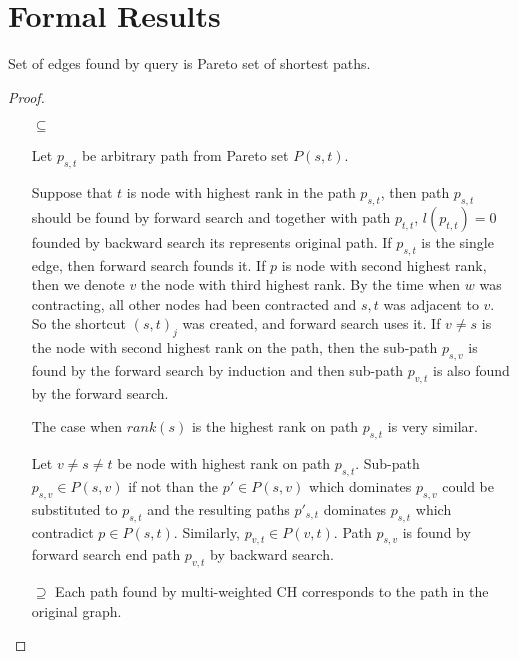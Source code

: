 

\section{Formal Results}
\label{secFormalResults}

\begin{lemma}
Set of edges found by query is Pareto set of shortest paths.
\end{lemma}
\begin{proof}
\begin{itemize}
\item[$\subseteq$] 

Let $p_{s,t}$ be arbitrary path from Pareto set $P(s,t)$. 

Suppose that $t$ is node with highest rank in the path $p_{s,t}$, 
then path $p_{s,t}$ should be found by forward search
and together with path $p_{t,t}$, $l(p_{t,t})=0$ 
founded by backward search its represents original path.
If $p_{s,t}$ is the single edge, then forward search founds it.
If $p$ is node with second highest rank, then we denote $v$ the
node with third highest rank. 
By the time when $w$ was contracting, all other nodes had been contracted
and $s,t$ was adjacent to $v$. So the shortcut $(s,t)_j$ was created, and forward search uses it.
If $v \ne s$ is the node with second highest rank on the path,
then the sub-path $p_{s,v}$ is found by the forward search by induction and
then sub-path $p_{v,t}$ is also found by the forward search.

The case when $rank(s)$ is the highest rank on path $p_{s,t}$ is very similar. 

Let $v \ne s \ne t$ be node with highest rank on path $p_{s,t}$. 
Sub-path $p_{s,v} \in P(s,v)$ 
if not than the $p' \in P(s,v)$ which dominates $p_{s,v}$ could be substituted
to $p_{s,t}$ and the resulting paths $p'_{s,t}$ dominates $p_{s,t}$ which contradict
$p \in P(s,t)$.
Similarly, $p_{v,t} \in P(v,t) $. Path $p_{s,v}$ is found by forward search end path
$p_{v,t}$ by backward search.

\item[$\supseteq$] 
Each path found by multi-weighted CH corresponds to the path in the original graph. 

\end{itemize}
\end{proof}

